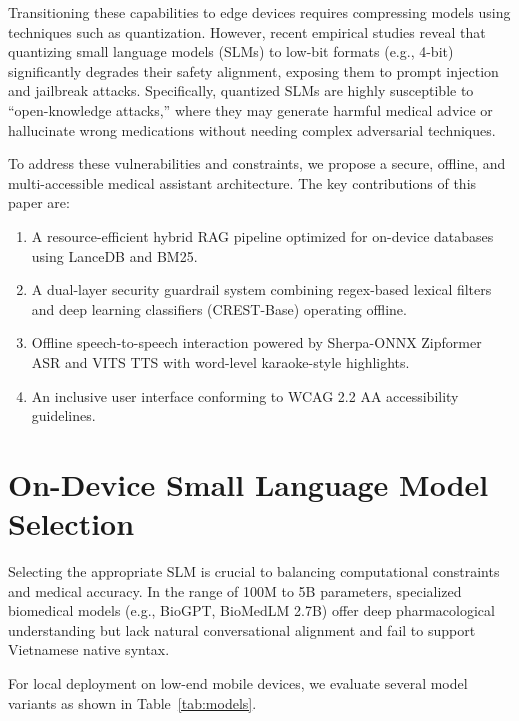 \documentclass[journal,compsoc]{IEEEtran}
\begin{document}
Transitioning these capabilities to edge devices requires compressing models using techniques such as quantization. However, recent empirical studies reveal that quantizing small language models (SLMs) to low-bit formats (e.g., 4-bit) significantly degrades their safety alignment, exposing them to prompt injection and jailbreak attacks. Specifically, quantized SLMs are highly susceptible to ``open-knowledge attacks,'' where they may generate harmful medical advice or hallucinate wrong medications without needing complex adversarial techniques.

To address these vulnerabilities and constraints, we propose a secure, offline, and multi-accessible medical assistant architecture. The key contributions of this paper are:
\begin{enumerate}
\item A resource-efficient hybrid RAG pipeline optimized for on-device databases using LanceDB and BM25.
\item A dual-layer security guardrail system combining regex-based lexical filters and deep learning classifiers (CREST-Base) operating offline.
\item Offline speech-to-speech interaction powered by Sherpa-ONNX Zipformer ASR and VITS TTS with word-level karaoke-style highlights.
\item An inclusive user interface conforming to WCAG 2.2 AA accessibility guidelines.
\end{enumerate}

\section{On-Device Small Language Model Selection}
Selecting the appropriate SLM is crucial to balancing computational constraints and medical accuracy. In the range of 100M to 5B parameters, specialized biomedical models (e.g., BioGPT, BioMedLM 2.7B) offer deep pharmacological understanding but lack natural conversational alignment and fail to support Vietnamese native syntax.

For local deployment on low-end mobile devices, we evaluate several model variants as shown in Table~\ref{tab:models}.
\end{document}
